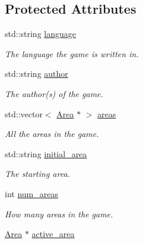 \subsection*{\-Protected \-Attributes}
\begin{DoxyCompactItemize}
\item 
\hypertarget{class_world_a910a48419528575e44eac36d7b517057}{
std\-::string \hyperlink{class_world_a910a48419528575e44eac36d7b517057}{language}}
\label{class_world_a910a48419528575e44eac36d7b517057}

\begin{DoxyCompactList}\small\item\em \-The language the game is written in. \end{DoxyCompactList}\item 
\hypertarget{class_world_a44a5680fc460f4b34d3ceaa66dded268}{
std\-::string \hyperlink{class_world_a44a5680fc460f4b34d3ceaa66dded268}{author}}
\label{class_world_a44a5680fc460f4b34d3ceaa66dded268}

\begin{DoxyCompactList}\small\item\em \-The author(s) of the game. \end{DoxyCompactList}\item 
\hypertarget{class_world_a981e5ee0065f8bdafd268747873e0c6b}{
std\-::vector$<$ \hyperlink{class_area}{\-Area} $\ast$ $>$ \hyperlink{class_world_a981e5ee0065f8bdafd268747873e0c6b}{areas}}
\label{class_world_a981e5ee0065f8bdafd268747873e0c6b}

\begin{DoxyCompactList}\small\item\em \-All the areas in the game. \end{DoxyCompactList}\item 
\hypertarget{class_world_a966a1049b9bc8c1c184a840da8817ab8}{
std\-::string \hyperlink{class_world_a966a1049b9bc8c1c184a840da8817ab8}{initial\-\_\-area}}
\label{class_world_a966a1049b9bc8c1c184a840da8817ab8}

\begin{DoxyCompactList}\small\item\em \-The starting area. \end{DoxyCompactList}\item 
\hypertarget{class_world_a5a190c6f7aed9fa156e4a2a78ddfafdb}{
int \hyperlink{class_world_a5a190c6f7aed9fa156e4a2a78ddfafdb}{num\-\_\-areas}}
\label{class_world_a5a190c6f7aed9fa156e4a2a78ddfafdb}

\begin{DoxyCompactList}\small\item\em \-How many areas in the game. \end{DoxyCompactList}\item 
\hypertarget{class_world_ab668d926b2c0fc6503ddc14974c79a81}{
\hyperlink{class_area}{\-Area} $\ast$ \hyperlink{class_world_ab668d926b2c0fc6503ddc14974c79a81}{active\-\_\-area}}
\label{class_world_ab668d926b2c0fc6503ddc14974c79a81}


\end{DoxyCompactItemize}
